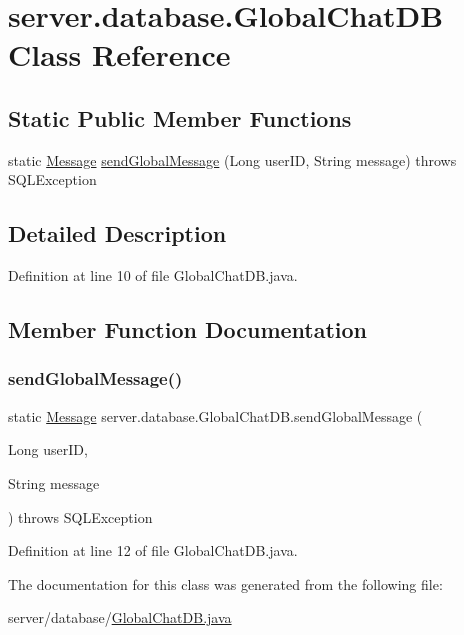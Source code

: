 \hypertarget{classserver_1_1database_1_1_global_chat_d_b}{}\section{server.\+database.\+Global\+Chat\+DB Class Reference}
\label{classserver_1_1database_1_1_global_chat_d_b}
\subsection*{Static Public Member Functions}
\begin{DoxyCompactItemize}
\item 
static \hyperlink{classsharedlib_1_1tuples_1_1_message}{Message} \hyperlink{classserver_1_1database_1_1_global_chat_d_b_a0a8aff70fce0910f547f91dbf94bf44f}{send\+Global\+Message} (Long user\+ID, String message)  throws S\+Q\+L\+Exception 
\end{DoxyCompactItemize}


\subsection{Detailed Description}


Definition at line 10 of file Global\+Chat\+D\+B.\+java.



\subsection{Member Function Documentation}
\hypertarget{classserver_1_1database_1_1_global_chat_d_b_a0a8aff70fce0910f547f91dbf94bf44f}{}\label{classserver_1_1database_1_1_global_chat_d_b_a0a8aff70fce0910f547f91dbf94bf44f} 
\subsubsection{\texorpdfstring{send\+Global\+Message()}{sendGlobalMessage()}}
{\footnotesize\ttfamily static \hyperlink{classsharedlib_1_1tuples_1_1_message}{Message} server.\+database.\+Global\+Chat\+D\+B.\+send\+Global\+Message (\begin{DoxyParamCaption}\item[{Long}]{user\+ID,  }\item[{String}]{message }\end{DoxyParamCaption}) throws S\+Q\+L\+Exception\hspace{0.3cm}{\ttfamily [static]}}



Definition at line 12 of file Global\+Chat\+D\+B.\+java.



The documentation for this class was generated from the following file\+:\begin{DoxyCompactItemize}
\item 
server/database/\hyperlink{_global_chat_d_b_8java}{Global\+Chat\+D\+B.\+java}\end{DoxyCompactItemize}
